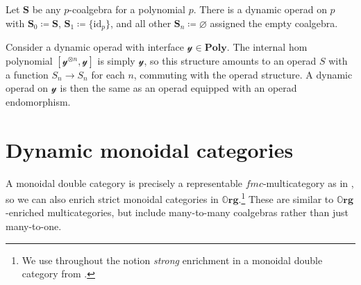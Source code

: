 \documentclass[11pt, one side, article]{memoir}
\theoremstyle{definition}
\theoremstyle{plain}
\newenvironment{example}
  {\pushQED{\qed}\renewcommand{\qedsymbol}{$\lozenge$}\examplex}
  {\popQED\endexamplex}
\newcommand{\Cat}[1]{\mathbf{#1}}%
\newcommand{\id}{\mathrm{id}}
\newcommand{\yon}{\mathcal{y}}
\newcommand{\poly}{\Cat{Poly}}
\newcommand{\0}{\textsf{0}}
\newcommand{\1}{\tn{\textsf{1}}}
\newcommand{\org}{{\mathbb{O}\Cat{rg}}}
\renewcommand{\S}{{\Cat{S}}}
\newcommand{\idcoalg}[1]{{\{\id_{#1}\}}}
\begin{document}
\begin{example}
Let $\S$ be any $p$-coalgebra for a polynomial $p$. There is a dynamic operad on $p$ with $\S_0\coloneqq \S$, $\S_1\coloneqq\idcoalg{p}$, and all other $\S_n\coloneqq\varnothing$ assigned the empty coalgebra.
\end{example}

\begin{example}
Consider a dynamic operad with interface $\yon\in\poly$. The internal hom polynomial $[\yon^{\otimes n},\yon]$ is simply $\yon$, so this structure amounts to an operad $S$ with a function $S_n \to S_n$ for each $n$, commuting with the operad structure. A dynamic operad on $\yon$ is then the same as an operad equipped with an operad endomorphism.
\end{example}



\section{Dynamic monoidal categories}\label{sec:org_monoidalcats}


A monoidal double category is precisely a representable $f\!m\!c$-multicategory as in \cite{shapiro2022enrichment}, %
so we can also enrich strict monoidal categories in $\org$.\footnote{We use throughout the notion \emph{strong} enrichment in a monoidal double category from \cite{shapiro2022enrichment}.} These are similar to $\org$-enriched multicategories, but include many-to-many coalgebras rather than just many-to-one. 
\end{document}

